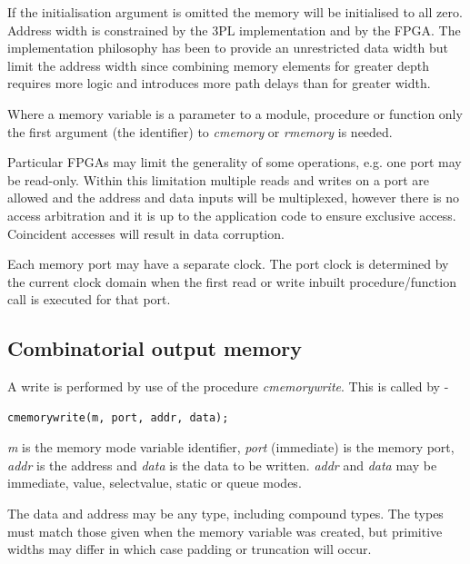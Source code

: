        If the initialisation argument is omitted the memory will be initialised
        to all zero. Address width is constrained by the 3PL implementation and
        by the FPGA. The implementation philosophy has been to provide an
        unrestricted data width but limit the address width since combining
        memory elements for greater depth requires more logic and introduces
        more path delays than for greater width.

        Where a memory variable is a parameter to a module, procedure or
        function only the first argument (the identifier) to {\em cmemory} or
        {\em rmemory} is needed.

        Particular FPGAs may limit the generality of some operations, e.g.
        one port may be read-only. Within this limitation multiple reads and
        writes on a port are allowed and the address and data inputs will be
        multiplexed, however there is no access arbitration and it is up to
        the application code to ensure exclusive access. Coincident accesses
        will result in data corruption.

        Each memory port may have a separate clock. The port clock is determined
        by the current clock domain when the first read or write inbuilt
        procedure/function call is executed for that port.
        
        

        \subsection{Combinatorial output memory}

            A write is performed by use of the procedure {\em cmemorywrite}.
            This is called by -
            \begin{lstlisting}[gobble=12, language=threepl]
                   cmemorywrite(m, port, addr, data);
            \end{lstlisting}
            {\em m} is the memory mode variable identifier, {\em port}
            (immediate) is the memory port, {\em addr} is the address and
            {\em data} is the data to be written. {\em addr} and {\em data}
            may be immediate, value, selectvalue, static or queue modes.

            The data and address may be any type, including compound types.
            The types must match those given when the memory variable
            was created, but primitive widths may differ in which case
            padding or truncation will occur.
            
